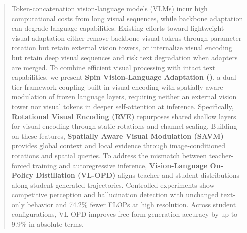\begin{abstract}
Token-concatenation vision-language models (VLMs) incur high computational
costs from long visual sequences, while backbone adaptation can degrade
language capabilities. Existing efforts toward lightweight visual adaptation
either remove backbone visual tokens through parameter rotation but retain
external vision towers, or internalize visual encoding but retain deep
visual sequences and risk text degradation when adapters are merged.
To combine efficient visual processing with intact text capabilities,
we present \textbf{Spin Vision-Language Adaptation (\modelname)},
a dual-tier framework coupling built-in visual encoding with spatially
aware modulation of frozen language layers, requiring neither an external
vision tower nor visual tokens in deeper self-attention at inference. Specifically, \textbf{Rotational Visual Encoding (RVE)}
repurposes shared shallow layers for visual encoding through static
rotations and channel scaling. Building on these features,
\textbf{Spatially Aware Visual Modulation (SAVM)} provides global context
and local evidence through image-conditioned rotations and spatial queries.
To address the mismatch between teacher-forced training and autoregressive
inference, \textbf{Vision-Language On-Policy Distillation (VL-OPD)} aligns
teacher and student distributions along student-generated trajectories.
Controlled experiments show competitive perception and hallucination
detection with unchanged text-only behavior and 74.2\% fewer FLOPs
at high resolution. Across student configurations, VL-OPD improves
free-form generation accuracy by up to 9.9\% in absolute terms.
\end{abstract}